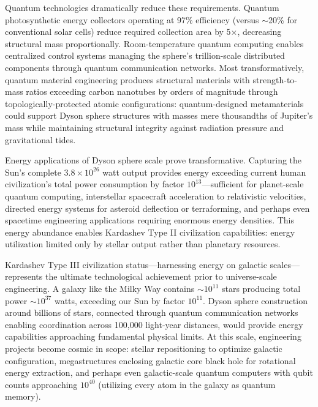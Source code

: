 \documentclass[11pt,a4paper,twoside]{article}
\begin{document}
Quantum technologies dramatically reduce these requirements. Quantum photosynthetic energy collectors operating at 97\% efficiency (versus $\sim$20\% for conventional solar cells) reduce required collection area by 5×, decreasing structural mass proportionally. Room-temperature quantum computing enables centralized control systems managing the sphere's trillion-scale distributed components through quantum communication networks. Most transformatively, quantum material engineering produces structural materials with strength-to-mass ratios exceeding carbon nanotubes by orders of magnitude through topologically-protected atomic configurations: quantum-designed metamaterials could support Dyson sphere structures with masses mere thousandths of Jupiter's mass while maintaining structural integrity against radiation pressure and gravitational tides.

Energy applications of Dyson sphere scale prove transformative. Capturing the Sun's complete $3.8 \times 10^{26}$ watt output provides energy exceeding current human civilization's total power consumption by factor $10^{13}$---sufficient for planet-scale quantum computing, interstellar spacecraft acceleration to relativistic velocities, directed energy systems for asteroid deflection or terraforming, and perhaps even spacetime engineering applications requiring enormous energy densities. This energy abundance enables Kardashev Type II civilization capabilities: energy utilization limited only by stellar output rather than planetary resources.

Kardashev Type III civilization status---harnessing energy on galactic scales---represents the ultimate technological achievement prior to universe-scale engineering. A galaxy like the Milky Way contains $\sim 10^{11}$ stars producing total power $\sim 10^{37}$ watts, exceeding our Sun by factor $10^{11}$. Dyson sphere construction around billions of stars, connected through quantum communication networks enabling coordination across 100,000 light-year distances, would provide energy capabilities approaching fundamental physical limits. At this scale, engineering projects become cosmic in scope: stellar repositioning to optimize galactic configuration, megastructures enclosing galactic core black hole for rotational energy extraction, and perhaps even galactic-scale quantum computers with qubit counts approaching $10^{40}$ (utilizing every atom in the galaxy as quantum memory).
\end{document}

